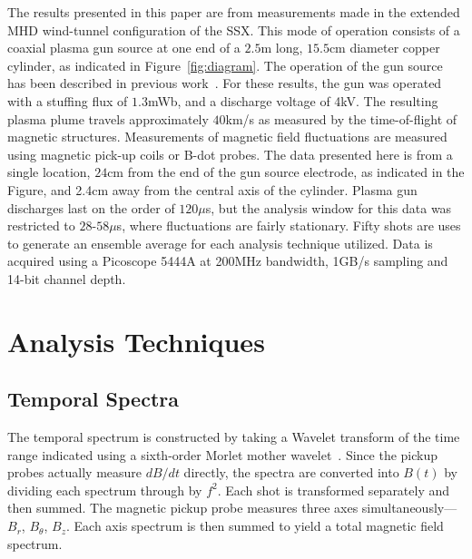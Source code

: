 \documentclass[aip,pop,amsmath,amssymb,preprint,superscriptaddress]{revtex4-1} %
\begin{document}
The results presented in this paper are from measurements made in the extended MHD wind-tunnel configuration of the SSX. This mode of operation consists of a coaxial plasma gun source at one end of a $2.5$m long, $15.5$cm diameter copper cylinder, as indicated in Figure~\ref{fig:diagram}. The operation of the gun source has been described in previous work~\cite{brown2014}. For these results, the gun was operated with a stuffing flux of $1.3$mWb, and a discharge voltage of 4kV. The resulting plasma plume travels approximately $40$km/s as measured by the time-of-flight of magnetic structures. Measurements of magnetic field fluctuations are measured using magnetic pick-up coils or B-dot probes. The data presented here is from a single location, $24$cm from the end of the gun source electrode, as indicated in the Figure, and 2.4cm away from the central axis of the cylinder. Plasma gun discharges last on the order of $120\mu$s, but the analysis window for this data was restricted to $28$-$58\mu$s, where fluctuations are fairly stationary. Fifty shots are uses to generate an ensemble average for each analysis technique utilized. Data is acquired using a Picoscope 5444A at 200MHz bandwidth, 1GB/s sampling and 14-bit channel depth.

\section{Analysis Techniques}

\subsection{Temporal Spectra}

The temporal spectrum is constructed by taking a Wavelet transform of the time range indicated using a sixth-order Morlet mother wavelet~\cite{brown2014}. Since the pickup probes actually measure $dB/dt$ directly, the spectra are converted into $B(t)$ by dividing each spectrum through by $f^2$. Each shot is transformed separately and then summed. The magnetic pickup probe measures three axes simultaneously---$B_{r}$, $B_{\theta}$, $B_{z}$. Each axis spectrum is then summed to yield a total magnetic field spectrum.
\end{document}
